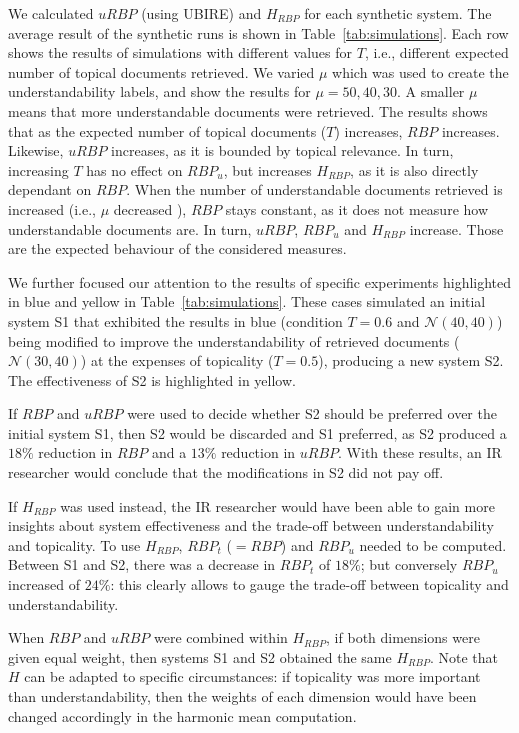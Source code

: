 We calculated $uRBP$ (using UBIRE) and $H_{RBP}$ for each synthetic system.
The average result of the synthetic runs is shown in Table~\ref{tab:simulations}. Each row shows the results of simulations with different values for $T$, i.e., different expected number of topical documents retrieved.
We varied $\mu$ which was used to create the understandability labels, and show the results for $\mu = 50, 40, 30$.
A smaller $\mu$ means that more understandable documents were retrieved. The results shows that as the expected number of topical documents ($T$) increases, $RBP$ increases. Likewise, $uRBP$ increases, as it is bounded by topical relevance.
In turn, increasing $T$ has no effect on $RBP_u$, but increases $H_{RBP}$, as it is also directly dependant on $RBP$. When the number of understandable documents retrieved is increased (i.e., $\mu$ decreased ), $RBP$ stays constant, as it does not measure how understandable documents are.
In turn, $uRBP$, $RBP_u$ and $H_{RBP}$ increase. 
Those are the expected behaviour of the considered measures. %

We further focused our attention to the results of specific experiments highlighted in blue and yellow in Table~\ref{tab:simulations}. These cases simulated an initial system S1 that exhibited the results in blue (condition $T=0.6$ and $\mathcal{N}(40,40)$) being modified to improve the understandability of retrieved documents ($\mathcal{N}(30,40)$) at the expenses of topicality ($T=0.5$), producing a new system S2. The effectiveness of S2 is highlighted in yellow. 

If $RBP$ and $uRBP$ were used to decide whether S2 should be preferred over the initial system S1, then S2 would be discarded and S1 preferred, as S2 produced a $18\%$ reduction in $RBP$ and a $13\%$ reduction in $uRBP$. With these results, an IR researcher would conclude that the modifications in S2 did not pay off.

If $H_{RBP}$ was used instead, the IR researcher would have been able to gain more insights about system effectiveness and the trade-off between understandability and topicality. To use $H_{RBP}$, $RBP_t$ ($=RBP$) and $RBP_u$ needed to be computed. Between S1 and S2, there was a decrease in $RBP_t$ of $18\%$; but conversely $RBP_u$ increased of $24\%$: this clearly allows to gauge the trade-off between topicality and understandability. 

When $RBP$ and $uRBP$ were combined within $H_{RBP}$, if both dimensions were given equal weight, then systems S1 and S2 obtained the same $H_{RBP}$. Note that $H$ can be adapted to specific circumstances: if topicality was more important than understandability, then the weights of each dimension would have been changed accordingly in the harmonic mean computation. 




